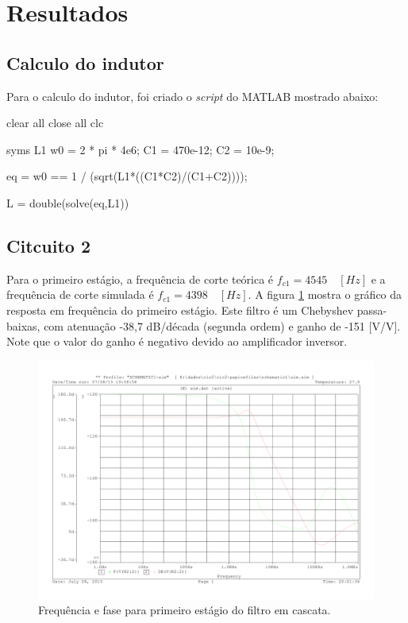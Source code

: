 \newpage
\section{Resultados}

\subsection{Calculo do indutor}

Para o calculo do indutor, foi criado o \textit{script} do MATLAB mostrado abaixo:


clear all 
close all
clc

syms L1 
w0 = 2 * pi * 4e6;
C1 = 470e-12;
C2 = 10e-9;
 
eq = w0 == 1 / (sqrt(L1*((C1*C2)/(C1+C2))));

L = double(solve(eq,L1))


\subsection{Citcuito 2}

Para o primeiro estágio, a frequência de corte teórica é $f_{c1} = 4545 \quad [Hz]$ e a frequência de corte simulada é $f_{c1} = 4398 \quad [Hz]$. A figura \ref{f_bode2} mostra o gráfico da resposta em frequência do primeiro estágio. Este filtro é um Chebyshev passa-baixas, com atenuação -38,7 dB/década (segunda ordem) e ganho de -151 [V/V].
Note que o valor do ganho é negativo devido ao amplificador inversor.

\begin{figure}[H]
\centering
\includegraphics[scale=0.5]{Imagens/bode2.pdf}
\caption{Frequência e fase para primeiro estágio do filtro em cascata.}
\label{f_bode2}
\end{figure}


